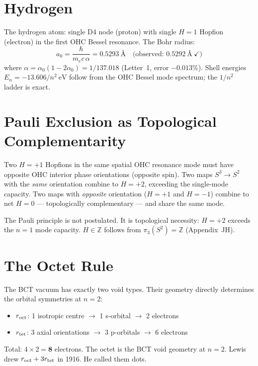 \documentclass[aps,prl,twocolumn,showpacs,superscriptaddress]{revtex4-2}
\begin{document}
\section{Hydrogen}

The hydrogen atom: single D4 node (proton) with single $H=1$ Hopfion 
(electron) in the first OHC Bessel resonance. The Bohr radius:
\begin{equation}
    a_0 = \frac{\hbar}{m_e c\,\alpha} = 0.5293~\text{\AA}
    \quad \text{(observed: } 0.5292~\text{\AA}\ \checkmark\text{)}
\end{equation}
where $\alpha = \alpha_0(1-2\alpha_0) = 1/137.018$ (Letter~1, error 
$-0.013\%$). Shell energies $E_n = -13.606/n^2~\text{eV}$ follow from 
the OHC Bessel mode spectrum; the $1/n^2$ ladder is exact.

\section{Pauli Exclusion as Topological Complementarity}

\begin{theorem}
Two $H=+1$ Hopfions in the same spatial OHC resonance mode must have 
opposite OHC interior phase orientations (opposite spin). Two maps 
$S^3\to S^2$ with the \emph{same} orientation combine to $H=+2$, 
exceeding the single-mode capacity. Two maps with \emph{opposite} 
orientation ($H=+1$ and $H=-1$) combine to net $H=0$ --- topologically 
complementary --- and share the same mode.
\end{theorem}

The Pauli principle is not postulated. It is topological necessity: 
$H=+2$ exceeds the $n=1$ mode capacity. $H\in\mathbb{Z}$ follows from 
$\pi_3(S^2) = \mathbb{Z}$ (Appendix~JH).

\section{The Octet Rule}

The BCT vacuum has exactly two void types. Their geometry directly 
determines the orbital symmetries at $n=2$:
\begin{itemize}
\item $r_{\rm oct}$: 1 isotropic centre $\to$ 1 s-orbital $\to$ 2 electrons
\item $r_{\rm tet}$: 3 axial orientations $\to$ 3 p-orbitals $\to$ 6 electrons
\end{itemize}
Total: $4 \times 2 = \mathbf{8}$ electrons. The octet is the BCT void 
geometry at $n=2$. Lewis drew $r_{\rm oct} + 3r_{\rm tet}$ in 1916. 
He called them dots.
\end{document}
